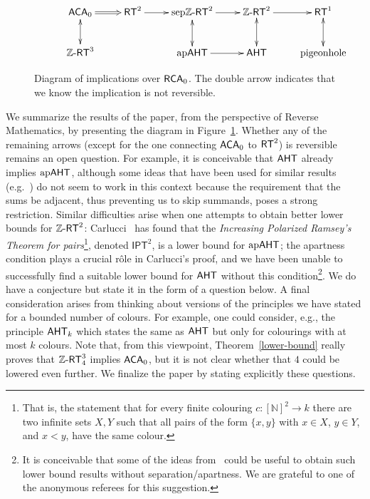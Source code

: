 \documentclass[11pt]{amsart}
\newcommand{\rt}{\mathnormal{\mathsf{RT}}}
\newcommand{\zrt}{\mathnormal{\mathbb Z\text{-}\mathsf{RT}}}
\newcommand{\aht}{\mathnormal{\mathsf{AHT}}}
\newcommand{\apaht}{\mathnormal{\mathrm{ap}\mathsf{AHT}}}
\newcommand{\sepzrt}{\mathnormal{\mathrm{sep}\mathbb Z\text{-}\mathsf{RT}}}
\newcommand{\rca}{\mathnormal{\mathsf{RCA}}_0}
\newcommand{\aca}{\mathnormal{\mathsf{ACA}}_0}
\theoremstyle{definition}
\begin{document}
\begin{figure}[t]
\centering
\begin{equation*}
\centerline{\xymatrix{
\aca \ar@{=>}[r] \ar@{<->}[d] & \rt^2 \ar@{->}[r] & \sepzrt^2 \ar@{->}[r] \ar@{<->}[d] & \zrt^2 \ar@{->}[r] \ar@{<->}[d] & \rt^1\ar@{<->}[d] \\
\zrt^3 &  & \apaht \ar@{->}[r]  & \aht  & \text{pigeonhole} \\
}}
\end{equation*}
\caption{Diagram of implications over $\rca$. The double arrow indicates that we know the implication is not reversible.}
\label{fig:diagrama}
\end{figure}

We summarize the results of the paper, from the perspective of Reverse Mathematics, by presenting the diagram in Figure~\ref{fig:diagrama}. Whether any of the remaining arrows (except for the one connecting $\aca$ to $\rt^2$) is reversible remains an open question. For example, it is conceivable that $\aht$ already implies $\apaht$, although some ideas that have been used for similar results (e.g.~\cite[Lemma 1]{carlucci-kolodziejczyk-et-al}) do not seem to work in this context because the requirement that the sums be adjacent, thus preventing us to skip summands, poses a strong restriction. Similar difficulties arise when one attempts to obtain better lower bounds for $\zrt^2$: Carlucci~\cite[Prop. 3]{carlucci-adjacent} has found that the {\it Increasing Polarized Ramsey's Theorem for pairs}\footnote{That is, the statement that for every finite colouring $c:[\mathbb N]^2\longrightarrow k$ there are two infinite sets $X,Y$ such that all pairs of the form $\{x,y\}$ with $x\in X$, $y\in Y$, and $x<y$, have the same colour.}, denoted $\mathsf{IPT}^2$, is a lower bound for $\apaht$; the apartness condition plays a crucial r\^ole in Carlucci's proof, and we have been unable to successfully find a suitable lower bound for $\aht$ without this condition\footnote{It is conceivable that some of the ideas from~\cite{reverse-hindman-exactly-two} could be useful to obtain such lower bound results without separation/apartness. We are grateful to one of the anonymous referees for this suggestion.}. We do have a conjecture but state it in the form of a question below. A final consideration arises from thinking about versions of the principles we have stated for a bounded number of colours. For example, one could consider, e.g., the principle $\aht_k$ which states the same as $\aht$ but only for colourings with at most $k$ colours. Note that, from this viewpoint, Theorem~\ref{lower-bound} really proves that $\zrt^3_4$ implies $\aca$, but it is not clear whether that $4$ could be lowered even further. We finalize the paper by stating explicitly these questions.
\end{document}
